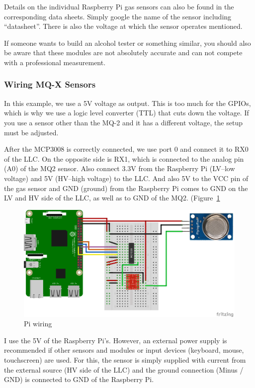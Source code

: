 \documentclass{article}\usepackage[]{graphicx}\usepackage[]{color}
\begin{document}
Details on the individual Raspberry Pi gas sensors can also be found in the corresponding data sheets. Simply google the name of the sensor including ``datasheet''. There is also the voltage at which the sensor operates mentioned.

If someone wants to build an alcohol tester or something similar, you should also be aware that these modules are not absolutely accurate and can not compete with a professional measurement.

\subsubsection{Wiring MQ-X Sensors}

In this example, we use a 5V voltage as output. This is too much for the GPIOs, which is why we use a logic level converter (TTL) that cuts down the voltage. If you use a sensor other than the MQ-2 and it has a different voltage, the setup must be adjusted.

After the MCP3008 is correctly connected, we use port 0 and connect it to RX0 of the LLC. On the opposite side is RX1, which is connected to the analog pin (A0) of the MQ2 sensor. Also connect 3.3V from the Raspberry Pi (LV--low voltage) and 5V (HV--high voltage) to the LLC. And also 5V to the VCC pin of the gas sensor and GND (ground) from the Raspberry Pi comes to GND on the LV and HV side of the LLC, as well as to GND of the MQ2. (Figure~\ref{fig:Pi-MQ2}

\begin{figure}
\includegraphics[width=1.00\textwidth]{Raspberry-Pi-Gas-Sensor-MQ2.png}
\caption{Pi wiring}
\label{fig:Pi-MQ2}
\end{figure}

I use the 5V of the Raspberry Pi's. However, an external power supply is recommended if other sensors and modules or input devices (keyboard, mouse, touchscreen) are used. For this, the sensor is simply supplied with current from the external source (HV side of the LLC) and the ground connection (Minus / GND) is connected to GND of the Raspberry Pi.
\end{document}
